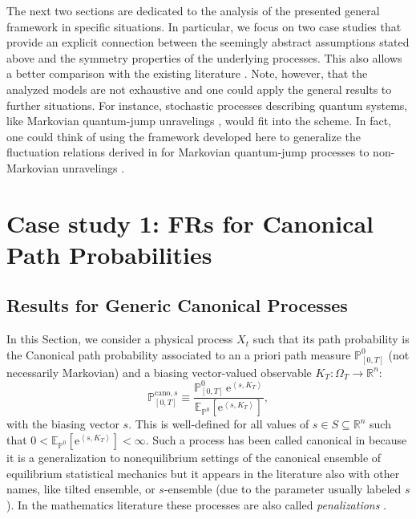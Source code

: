 \documentclass[a4paper,11pt]{article}
\numberwithin{equation}{section}
\begin{document}
The next two sections are dedicated to the analysis of the presented general framework in specific situations. In particular, we focus on two case studies that provide an explicit connection between the seemingly abstract assumptions stated above and the symmetry properties of the underlying processes. This also allows a better comparison with the existing literature \cite{Hur+11,Hur+14,LG14,PRG15,MPG20}. Note, however, that the analyzed models are not exhaustive and one could apply the general results to further situations. For instance, stochastic processes describing quantum systems, like Markovian quantum-jump unravelings \cite{WM10}, would fit into the scheme. In fact, one could think of using the framework developed here to generalize the fluctuation relations derived in \cite{MPG21} for Markovian quantum-jump processes to non-Markovian unravelings \cite{SCP20}.




\section{Case study 1: FRs for Canonical Path Probabilities}
\label{sec:canonical}

\subsection{Results for Generic Canonical Processes}

In this Section, we consider a physical process $X_{t}$ such that its path probability is the Canonical path probability \cite{Gar+09, JS10, CT13, CT15a, CT15b, JS15} associated to an a priori path measure $\mathbb{P}_{\left[0,T\right]}^{0}$
(not necessarily Markovian) and a biasing vector-valued observable $K_T: \Omega_T \to \mathbb{R}^{n}$: 
\begin{equation}\label{eq:cano}
   \mathbb{P}_{\left[0,T\right]}^{\mathrm{cano},s} \equiv\frac{\mathbb{P}_{\left[0,T\right]}^{0}\,  \mathrm{e}^{\left\langle s,K_T \right\rangle}  }{\mathbb{E}_{\mathbb{P}^{0}} \!\left[\mathrm{e}^{\left\langle s,K_T\right\rangle }\right]}, 
\end{equation}
with the biasing vector $s$. This is well-defined for all values of $s \in S\subseteq \mathbb{R}^n$ such that $0< \mathbb{E}_{\mathbb{P}^{0}} \!\left[\mathrm{e}^{\left\langle s,K_T\right\rangle }\right] < \infty$. Such a process has been called canonical in \cite{CT15a} because it is a generalization to nonequilibrium settings of the canonical ensemble of equilibrium statistical mechanics but it appears in the literature also with other names, like tilted ensemble, or $s$-ensemble (due to the parameter usually labeled $s$). In the mathematics literature these processes are also called \emph{penalizations} \cite{RY09}.
\end{document}
